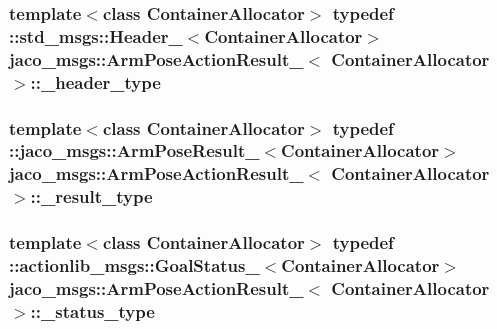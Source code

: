 \subsubsection[{\texorpdfstring{\+\_\+header\+\_\+type}{_header_type}}]{\setlength{\rightskip}{0pt plus 5cm}template$<$class Container\+Allocator$>$ typedef \+::std\+\_\+msgs\+::\+Header\+\_\+$<$Container\+Allocator$>$ {\bf jaco\+\_\+msgs\+::\+Arm\+Pose\+Action\+Result\+\_\+}$<$ Container\+Allocator $>$\+::{\bf \+\_\+header\+\_\+type}}\hypertarget{structjaco__msgs_1_1ArmPoseActionResult___accf60f842d4109bd135b54bf14456fe0}{}\label{structjaco__msgs_1_1ArmPoseActionResult___accf60f842d4109bd135b54bf14456fe0}
\subsubsection[{\texorpdfstring{\+\_\+result\+\_\+type}{_result_type}}]{\setlength{\rightskip}{0pt plus 5cm}template$<$class Container\+Allocator$>$ typedef \+::{\bf jaco\+\_\+msgs\+::\+Arm\+Pose\+Result\+\_\+}$<$Container\+Allocator$>$ {\bf jaco\+\_\+msgs\+::\+Arm\+Pose\+Action\+Result\+\_\+}$<$ Container\+Allocator $>$\+::{\bf \+\_\+result\+\_\+type}}\hypertarget{structjaco__msgs_1_1ArmPoseActionResult___ae000110dfd7c7cf641eb12b4e92cdfa9}{}\label{structjaco__msgs_1_1ArmPoseActionResult___ae000110dfd7c7cf641eb12b4e92cdfa9}
\subsubsection[{\texorpdfstring{\+\_\+status\+\_\+type}{_status_type}}]{\setlength{\rightskip}{0pt plus 5cm}template$<$class Container\+Allocator$>$ typedef \+::actionlib\+\_\+msgs\+::\+Goal\+Status\+\_\+$<$Container\+Allocator$>$ {\bf jaco\+\_\+msgs\+::\+Arm\+Pose\+Action\+Result\+\_\+}$<$ Container\+Allocator $>$\+::{\bf \+\_\+status\+\_\+type}}\hypertarget{structjaco__msgs_1_1ArmPoseActionResult___a3bcda59a5c50ad41670c134e22ea1013}{}\label{structjaco__msgs_1_1ArmPoseActionResult___a3bcda59a5c50ad41670c134e22ea1013}
